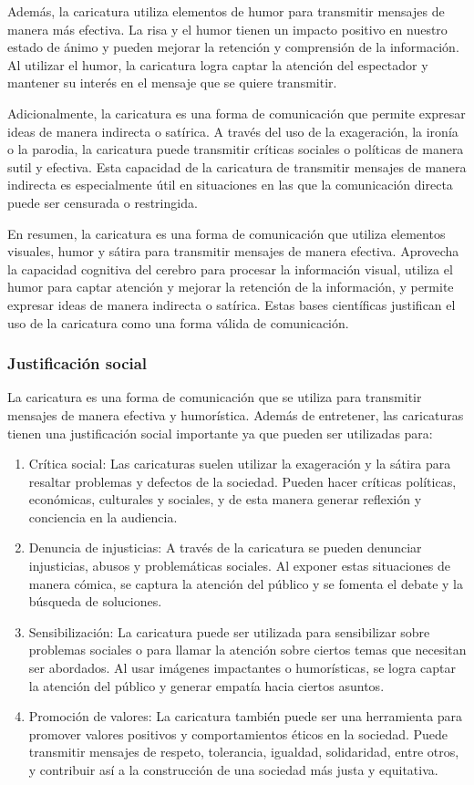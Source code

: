 \documentclass[12pt,a4paper]{article}
\begin{document}
Además, la caricatura utiliza elementos de humor para transmitir mensajes de manera más efectiva. La risa y el humor tienen un impacto positivo en nuestro estado de ánimo y pueden mejorar la retención y comprensión de la información. Al utilizar el humor, la caricatura logra captar la atención del espectador y mantener su interés en el mensaje que se quiere transmitir.

Adicionalmente, la caricatura es una forma de comunicación que permite expresar ideas de manera indirecta o satírica. A través del uso de la exageración, la ironía o la parodia, la caricatura puede transmitir críticas sociales o políticas de manera sutil y efectiva. Esta capacidad de la caricatura de transmitir mensajes de manera indirecta es especialmente útil en situaciones en las que la comunicación directa puede ser censurada o restringida.

En resumen, la caricatura es una forma de comunicación que utiliza elementos visuales, humor y sátira para transmitir mensajes de manera efectiva. Aprovecha la capacidad cognitiva del cerebro para procesar la información visual, utiliza el humor para captar atención y mejorar la retención de la información, y permite expresar ideas de manera indirecta o satírica. Estas bases científicas justifican el uso de la caricatura como una forma válida de comunicación.

\subsubsection{Justificación social}
La caricatura es una forma de comunicación que se utiliza para transmitir mensajes de manera efectiva y humorística. Además de entretener, las caricaturas tienen una justificación social importante ya que pueden ser utilizadas para:

\begin{enumerate}
	\item  Crítica social: Las caricaturas suelen utilizar la exageración y la sátira para resaltar problemas y defectos de la sociedad. Pueden hacer críticas políticas, económicas, culturales y sociales, y de esta manera generar reflexión y conciencia en la audiencia.
	\item Denuncia de injusticias: A través de la caricatura se pueden denunciar injusticias, abusos y problemáticas sociales. Al exponer estas situaciones de manera cómica, se captura la atención del público y se fomenta el debate y la búsqueda de soluciones.
	\item  Sensibilización: La caricatura puede ser utilizada para sensibilizar sobre problemas sociales o para llamar la atención sobre ciertos temas que necesitan ser abordados. Al usar imágenes impactantes o humorísticas, se logra captar la atención del público y generar empatía hacia ciertos asuntos.
	\item  Promoción de valores: La caricatura también puede ser una herramienta para promover valores positivos y comportamientos éticos en la sociedad. Puede transmitir mensajes de respeto, tolerancia, igualdad, solidaridad, entre otros, y contribuir así a la construcción de una sociedad más justa y equitativa.
\end{enumerate}
\end{document}

